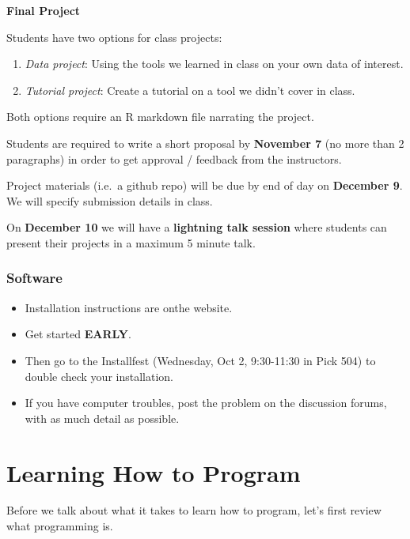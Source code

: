 \documentclass[]{book}
\providecommand{\tightlist}{%
  \setlength{\itemsep}{0pt}\setlength{\parskip}{0pt}}
\begin{document}
\textbf{Final Project}

Students have two options for class projects:

\begin{enumerate}
\def\labelenumi{\arabic{enumi}.}
\item
  \emph{Data project}: Using the tools we learned in class on your own
  data of interest.
\item
  \emph{Tutorial project}: Create a tutorial on a tool we didn't cover
  in class.
\end{enumerate}

Both options require an R markdown file narrating the project.

Students are required to write a short proposal by \textbf{November 7}
(no more than 2 paragraphs) in order to get approval / feedback from the
instructors.

Project materials (i.e.~a github repo) will be due by end of day on
\textbf{December 9}. We will specify submission details in class.

On \textbf{December 10} we will have a \textbf{lightning talk session}
where students can present their projects in a maximum 5 minute talk.

\subsubsection*{Software}\label{software}

\begin{itemize}
\tightlist
\item
  Installation instructions are onthe website.
\item
  Get started \textbf{EARLY}.
\item
  Then go to the Installfest (Wednesday, Oct 2, 9:30-11:30 in Pick 504)
  to double check your installation.
\item
  If you have computer troubles, post the problem on the discussion
  forums, with as much detail as possible.
\end{itemize}

\section{Learning How to Program}\label{learning-how-to-program}

Before we talk about what it takes to learn how to program, let's first
review what programming is.
\end{document}
